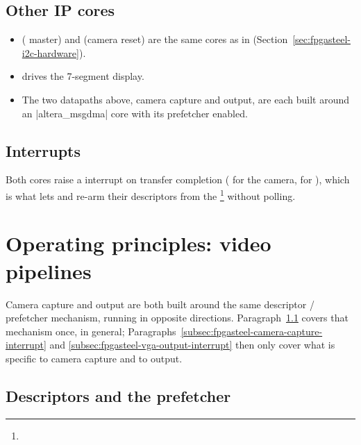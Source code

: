 \subsection{Other IP cores}
\label{subsec:fpgasteel-simple-forwarding-other-ip}

\begin{itemize}
    \item \textbf{} ( master) and \textbf{} (camera reset) are the same cores as in  (Section~\ref{sec:fpgasteel-i2c-hardware}).
    \item \textbf{} drives the 7-segment display.
    \item The two datapaths above, camera capture and  output, are each built around an |altera_msgdma| core with its prefetcher enabled.
\end{itemize}

\subsection{Interrupts}
\label{subsec:fpgasteel-simple-forwarding-interrupts}

Both  cores raise a  interrupt on transfer completion ( for the camera,  for ), which is what lets  and  re-arm their descriptors from the \footnote{} without polling.

\section{Operating principles:  video pipelines}
\label{sec:fpgasteel-msgdma-video-pipelines}

Camera capture and  output are both built around the same descriptor / prefetcher mechanism, running in opposite directions. Paragraph~\ref{subsec:fpgasteel-descriptors-prefetcher} covers that mechanism once, in general; Paragraphs~\ref{subsec:fpgasteel-camera-capture-interrupt} and \ref{subsec:fpgasteel-vga-output-interrupt} then only cover what is specific to camera capture and to  output.

\subsection{Descriptors and the prefetcher}
\label{subsec:fpgasteel-descriptors-prefetcher}

